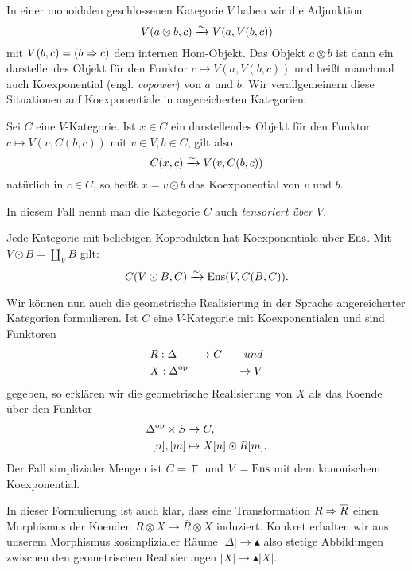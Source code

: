 In einer monoidalen geschlossenen Kategorie $V$ haben wir die Adjunktion
\[ V(a \otimes b, c) \xrightarrow[]{\sim} V(a, V(b, c)) \]
mit $V(b, c) = (b \Rightarrow c)$ dem internen Hom-Objekt. Das Objekt $a
\otimes b$ ist dann ein darstellendes Objekt für den Funktor $c
\mapsto V(a, V(b, c))$ und heißt manchmal auch Koexponential
(engl. \emph{copower}) von $a$ und $b$. Wir verallgemeinern diese
Situationen auf Koexponentiale in angereicherten Kategorien:
\begin{defn} \label{copower}
  Sei $C$ eine $V$-Kategorie. Ist $x \in C$ ein darstellendes Objekt
  für den Funktor $c \mapsto V(v, C(b, c))$ mit $v \in V, b \in C$,
  gilt also
  \[ C(x, c) \xrightarrow[]{\sim} V(v, C(b, c)) \]
  natürlich in $c \in C$, so heißt $x = v \odot b$ das Koexponential
  von $v$ und $b$.  
\end{defn}
In diesem Fall nennt man die Kategorie $C$ auch \emph{tensoriert über
  $V$}.
\begin{bsp} \label{ens-tensored}
  Jede Kategorie mit beliebigen Koprodukten hat Koexponentiale über
  $\operatorname{Ens}$. Mit $V \odot B = \coprod_V B$ gilt:
  \[ C(V \odot B, C) \xrightarrow[]{\sim} \operatorname{Ens}(V, C(B, C)). \]
\end{bsp}

Wir können nun auch die geometrische Realisierung in der Sprache
angereicherter Kategorien formulieren. Ist $C$ eine $V$-Kategorie mit
Koexponentialen und sind Funktoren
\begin{align*}
  &R: \Delta &\to C \qquad{und} \\
  &X: \Delta^\mathrm{op} &\to V
\end{align*}
gegeben, so erklären wir die geometrische Realisierung von $X$ als das
Koende über den Funktor
\begin{align*}
  \Delta^\mathrm{op} \times S &\to C, \\
  [n], [m] &\mapsto X[n] \odot R[m].
\end{align*}
Der Fall simplizialer Mengen ist $C = \Top$ und $V = \operatorname{Ens}$ mit dem
kanonischem Koexponential.

\begin{bem} \label{real-model-natural}
  In dieser Formulierung ist auch klar, dass eine Transformation $R
  \Rightarrow \overline{R}$ einen Morphismus der Koenden $R \otimes X \to
  \overline{R} \otimes X$ induziert. Konkret erhalten wir aus unserem
  Morphismus kosimplizialer Räume $|\Delta| \to \blacktriangle$ also
  stetige Abbildungen zwischen den geometrischen Realisierungen $|X|
  \to \blacktriangle |X|$.
\end{bem}


